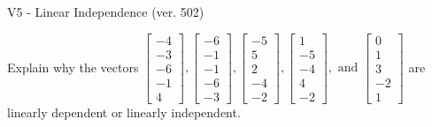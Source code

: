 \begin{exercise}
  \begin{exerciseTitle}V5 - Linear Independence (ver. 502)\end{exerciseTitle}
  \begin{exerciseStatement}
    Explain why the vectors \(\left[\begin{array}{r}
-4 \\
-3 \\
-6 \\
-1 \\
4
\end{array}\right] , \left[\begin{array}{r}
-6 \\
-1 \\
-1 \\
-6 \\
-3
\end{array}\right] , \left[\begin{array}{r}
-5 \\
5 \\
2 \\
-4 \\
-2
\end{array}\right] , \left[\begin{array}{r}
1 \\
-5 \\
-4 \\
4 \\
-2
\end{array}\right] , \text{ and } \left[\begin{array}{r}
0 \\
1 \\
3 \\
-2 \\
1
\end{array}\right]\) are linearly dependent or linearly independent.	



\end{exerciseStatement}
\end{exercise}
